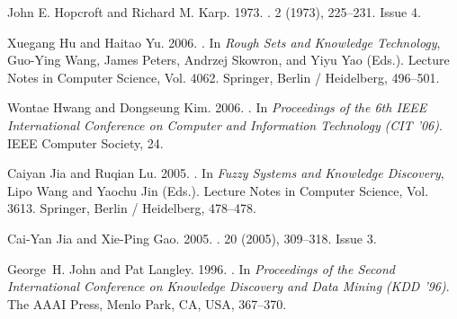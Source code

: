\begin{thebibliography}{00}
{John E. Hopcroft} {and} {Richard M. Karp}. 1973.
\newblock {}.
  {2} (1973),
  225--231.
\newblock
Issue 4.

{Xuegang Hu} {and} {Haitao Yu}. 2006.
\newblock {}.
\newblock In {\em Rough Sets and Knowledge Technology}, {Guo-Ying Wang}, {James
  Peters}, {Andrzej Skowron}, {and} {Yiyu Yao} (Eds.). Lecture Notes in
  Computer Science, Vol. 4062. Springer, Berlin / Heidelberg, 496--501.


{Wontae Hwang} {and} {Dongseung Kim}. 2006.
\newblock {}. In {\em Proceedings of the 6th IEEE International Conference on
  Computer and Information Technology} {\em (CIT '06)}. IEEE Computer Society,
  24.


{Caiyan Jia} {and} {Ruqian Lu}. 2005.
\newblock {}.
\newblock In {\em Fuzzy Systems and Knowledge Discovery}, {Lipo Wang} {and}
  {Yaochu Jin} (Eds.). Lecture Notes in Computer Science, Vol. 3613. Springer,
  Berlin / Heidelberg, 478--478.


{Cai-Yan Jia} {and} {Xie-Ping Gao}. 2005.
\newblock {}.
  {20} (2005),
  309--318.
\newblock
Issue 3.


{George~H. John} {and} {Pat Langley}. 1996.
\newblock {}. In
  {\em Proceedings of the Second International Conference on Knowledge
  Discovery and Data Mining} {\em (KDD '96)}. The AAAI Press, Menlo Park, CA,
  USA, 367--370.



\end{thebibliography}
